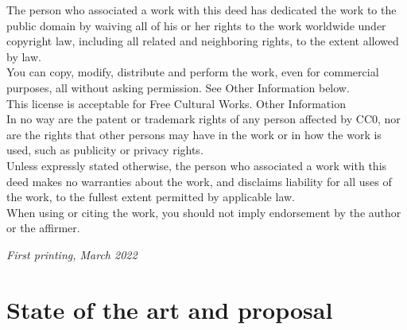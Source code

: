 \documentclass[
	11pt, %
	fleqn, %
	a4paper, %
]{LegrandOrangeBook}
\begin{document}
\noindent The person who associated a work with this deed has dedicated the work to the public domain by waiving all of his or her rights to the work worldwide under copyright law, including all related and neighboring rights, to the extent allowed by law.\\
You can copy, modify, distribute and perform the work, even for commercial purposes, all without asking permission. See Other Information below.\\
This license is acceptable for Free Cultural Works.
Other Information\\
In no way are the patent or trademark rights of any person affected by CC0, nor are the rights that other persons may have in the work or in how the work is used, such as publicity or privacy rights.\\
Unless expressly stated otherwise, the person who associated a work with this deed makes no warranties about the work, and disclaims liability for all uses of the work, to the fullest extent permitted by applicable law.\\
When using or citing the work, you should not imply endorsement by the author or the affirmer.



\noindent \textit{First printing, March 2022} %


\pagestyle{empty} %

\tableofcontents %

\listoffigures %

\listoftables %

\pagestyle{fancy} %

\cleardoublepage %


\part{State of the art and proposal}
\end{document}
